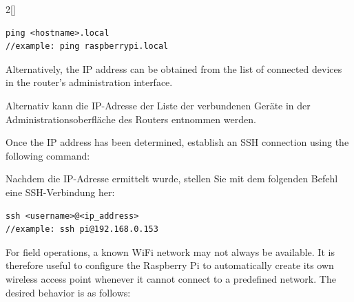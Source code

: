\begin{paracol}{2}[]
\colende


\begin{lstlisting}[style=shell]
ping <hostname>.local
//example: ping raspberrypi.local
\end{lstlisting}
\colstart

Alternatively, the IP address can be obtained from the list of connected devices in the router's administration interface.

\colger

Alternativ kann die IP-Adresse der Liste der verbundenen Geräte in der Administrationsoberfläche des Routers entnommen werden.

\coleng

Once the IP address has been determined, establish an SSH connection using the following command:

\colger

Nachdem die IP-Adresse ermittelt wurde, stellen Sie mit dem folgenden Befehl eine SSH-Verbindung her:

\colende


\begin{lstlisting}[style=shell]
ssh <username>@<ip_address>
//example: ssh pi@192.168.0.153
\end{lstlisting}

\renewcommand{\deutschertitel}{Konfiguration eines WLAN-Hotspots als Rückfalllösung}
\renewcommand{\englischertitel}{Configuring a Fallback WiFi Hotspot}
\makrounterunterabschnitt

For field operations, a known WiFi network may not always be available. It is therefore useful to configure the Raspberry Pi to automatically create its own wireless access point whenever it cannot connect to a predefined network. The desired behavior is as follows:


\end{paracol}
